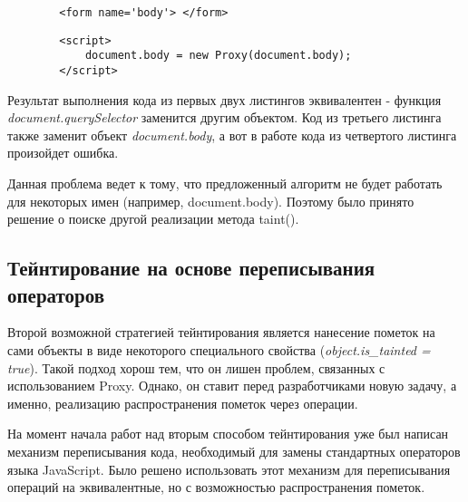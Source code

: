 	\begin{lstlisting}
		<form name='body'> </form>
	\end{lstlisting}

	\begin{lstlisting}
		<script>
			document.body = new Proxy(document.body);
		</script>
	\end{lstlisting}

	Результат выполнения кода из первых двух листингов эквивалентен - функция \textit{document.querySelector} заменится другим объектом. Код из третьего листинга также заменит объект \textit{document.body}, а вот в работе кода из четвертого листинга произойдет ошибка.


	Данная проблема ведет к тому, что предложенный алгоритм не будет работать для некоторых имен (например, document.body). Поэтому было принято решение о поиске другой реализации метода taint().

\subsection{Тейнтирование на основе переписывания операторов}
	Второй возможной стратегией тейнтирования является нанесение пометок на сами объекты в виде некоторого специального свойства (\textit{object.is\_tainted = true}). Такой подход хорош тем, что он лишен проблем, связанных с использованием Proxy. Однако, он ставит перед разработчиками новую задачу, а именно, реализацию распространения пометок через операции.


	На момент начала работ над вторым способом тейнтирования уже был написан механизм переписывания кода, необходимый для замены стандартных операторов языка JavaScript. Было решено использовать этот механизм для переписывания операций на эквивалентные, но с возможностью распространения пометок. 



